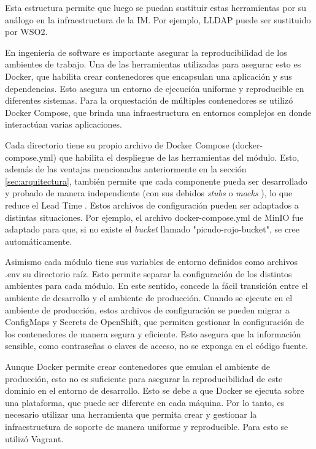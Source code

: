 Esta estructura permite que luego se puedan sustituir estas herramientas por su análogo en la infraestructura de la IM. Por ejemplo, LLDAP puede ser sustituido por WSO2.

En ingeniería de software es importante asegurar la reproducibilidad de los ambientes de trabajo. Una de las herramientas utilizadas para asegurar esto es Docker, que habilita crear contenedores que encapsulan una aplicación y sus dependencias. Esto asegura un entorno de ejecución uniforme y reproducible en diferentes sistemas. Para la orquestación de múltiples contenedores se utilizó Docker Compose, que brinda una infraestructura en entornos complejos en donde interactúan varias aplicaciones.

Cada directorio tiene su propio archivo de Docker Compose (docker-compose.yml) que habilita el despliegue de las herramientas del módulo. Esto, además de las ventajas mencionadas anteriormente en la sección \ref{sec:arquitectura}, también permite que cada componente pueda ser desarrollado y probado de manera independiente (con sus debidos \textit{stubs} \citep{wikipedia_talon_2025} o \textit{mocks} \citep{wikipedia_objeto_2024}), lo que reduce el Lead Time \citep{wikipedia_lead_2025}. Estos archivos de configuración pueden ser adaptados a distintas situaciones. Por ejemplo, el archivo docker-compose.yml de MinIO fue adaptado para que, si no existe el \textit{bucket} llamado "picudo-rojo-bucket", se cree automáticamente.

Asimismo cada módulo tiene sus variables de entorno definidos como archivos .env su directorio raíz. Esto permite separar la configuración de los distintos ambientes para cada módulo. En este sentido, concede la fácil transición entre el ambiente de desarrollo y el ambiente de producción. Cuando se ejecute en el ambiente de producción, estos archivos de configuración se pueden migrar a ConfigMaps \citep{red_hat_chapter_nodate} y Secrets \citep{red_hat_chapter_nodate-1} de OpenShift, que permiten gestionar la configuración de los contenedores de manera segura y eficiente. Esto asegura que la información sensible, como contraseñas o claves de acceso, no se exponga en el código fuente.

Aunque Docker permite crear contenedores que emulan el ambiente de producción, esto no es suficiente para asegurar la reproducibilidad de este dominio en el entorno de desarrollo. Esto se debe a que Docker se ejecuta sobre una plataforma, que puede ser diferente en cada máquina. Por lo tanto, es necesario utilizar una herramienta que permita crear y gestionar la infraestructura de soporte de manera uniforme y reproducible. Para esto se utilizó Vagrant.

